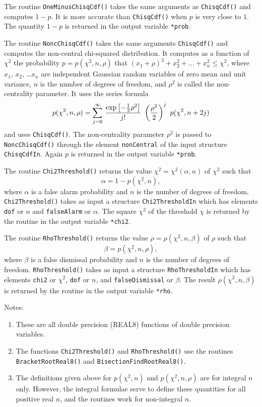 The routine \verb+OneMinusChisqCdf()+ takes the same arguments as
\verb+ChisqCdf()+ and computes $1-p$.  It is more accurate than
\verb+ChisqCdf()+ when $p$ is very close to $1$.  The quantity $1-p$
is returned in the output variable \verb+*prob+.


The routine \verb+NoncChisqCdf()+ takes the same arguments
\verb+ChisqCdf()+ and computes the non-central chi-squared
distribution.  It computes as a function of $\chi^2$ the
probability $p = p(\chi^2,n,\rho)$ that $(x_1+\rho)^2 + x_2^2 + \ldots
+ x_n^2 \le \chi^2$, 
where $x_1$, $x_2$, \ldots $x_n$ are independent Gaussian random
variables of zero mean and unit variance, $n$ is the number of
degrees of freedom, and $\rho^2$ is called the non-centrality
parameter.  It uses the series formula
$$
p(\chi^2,n,\rho) = \sum_{j=0}^\infty \, { \exp\left[ -{1 \over 2}
\rho^2 \right] \over j!} \ \left( {\rho^2 \over 2} \right)^j \
p(\chi^2,n+2j)
$$
and uses \verb+ChisqCdf()+.  The non-centrality parameter
$\rho^2$ is passed to \verb+NoncChisqCdf()+ through the element
\verb+nonCentral+ of the input structure \verb+ChisqCdfIn+.
Again $p$ is returned in the output variable \verb+*prob+.



The routine \verb+Chi2Threshold()+ returns the value $\chi^2 =
\chi^2(\alpha,n)$ of $\chi^2$ such that 
$$
\alpha = 1 - p(\chi^2,n),
$$
where $\alpha$ is a false alarm probability and $n$ is the number of
degrees of freedom.  \verb+Chi2Threshold()+ takes as input a
structure \verb+Chi2ThresholdIn+ which has elements \verb+dof+ or
$n$ and \verb+falseAlarm+ or $\alpha$.  The square $\chi^2$ of the
threshold $\chi$ is returned by the routine in the output variable
\verb+*chi2+. 




The routine \verb+RhoThreshold()+ returns the value $\rho =
\rho(\chi^2,n,\beta)$ of $\rho$ such that 
$$
\beta = p(\chi^2,n,\rho),
$$
where $\beta$ is a false dismissal probability and $n$ is the number
of degrees of freedom.  \verb+RhoThreshold()+ takes as input a
structure \verb+RhoThresholdIn+ which has elements \verb+chi2+ or
$\chi^2$, \verb+dof+ or $n$, and \verb+falseDismissal+ or $\beta$.
The result $\rho(\chi^2,n,\beta)$ is returned by the routine in the
output variable \verb+*rho+. 


Notes:
\begin{enumerate}
\item These are all double precision (REAL8) functions of double
precision variables.
\item The functions \verb+Chi2Threshold()+ and \verb+RhoThreshold()+
use the routines \verb+BracketRootReal8()+ and
\verb+BisectionFindRootReal8()+. 
\item The definitions given above for $p(\chi^2,n)$ and
$p(\chi^2,n,\rho)$ are for integral $n$ only.  However,
the integral formulae serve to define these quantities for all
positive real $n$, and the routines work for non-integral $n$.
\end{enumerate}

